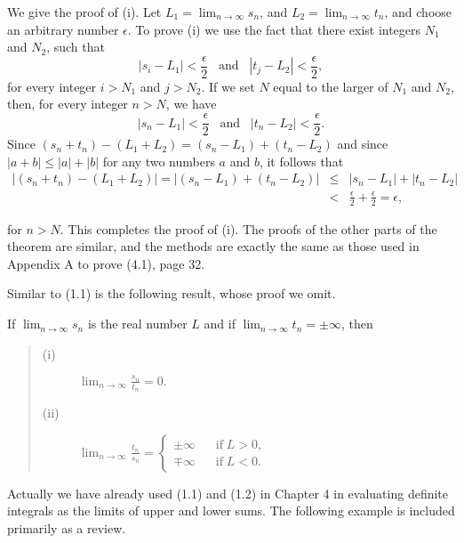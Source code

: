 We give the proof of (i). Let $L_1 = \lim_{n \rightarrow \infty} s_n$, and $L_2 = \lim_{n \rightarrow \infty} t_n$, and choose an arbitrary number $\epsilon$. To prove (i) we use the fact that there exist integers $N_1$ and $N_2$, such that
$$
|s_i - L_1 | < \frac{\epsilon}{2} \;\;\;  \mbox{and}\;\;\;  |t_j - L_2| < \frac{\epsilon}{2},
$$
for every integer $i > N_1$ and $j > N_2$. If we set $N$ equal to the larger of $N_1$ and $N_2$, then, for every integer $n > N$, we have
$$
|s_n - L_1| < \frac{\epsilon}{2}\;\;\; \mbox{and}\;\;\; | t_n - L_2 | < \frac{\epsilon}{2} .
$$
Since $(s_n + t_n) - (L_1 + L_2) = (s_n - L_1) + (t_n - L_2)$ and since $|a + b| \leq |a| + |b|$ for any two numbers $a$ and $b$, it follows that
\begin{eqnarray*}
|(s_n + t_n) - (L_1 + L_2)| = |(s_n - L_1) + (t_n - L_2)|
&\leq& |s_n - L_1| + |t_n - L_2 | \\
&<& \frac{\epsilon}{2} + \frac{\epsilon}{2} = \epsilon ,
\end{eqnarray*}

\noindent for $n > N$. This completes the proof of (i). The proofs of the other parts of the theorem are similar, and the methods are exactly the same as those used in Appendix A to prove (4.1), page 32.

Similar to (1.1) is the following result, whose proof we omit. 

\begin{theorem} %
If $\lim_{n \rightarrow \infty} s_n$ is the real number $L$ and if $\lim_{n \rightarrow \infty} t_n = \pm \infty$, then

\begin{quote}
\begin{description}

\item[(i)] $\lim_{n \rightarrow \infty} \frac{s_n}{t_n} = 0.$ 
\item[(ii)] $\lim_{n \rightarrow \infty} \frac{t_n}{s_n} 
= \left\{ \begin{array}{ll}
\pm \infty  &\;\;\;\mbox{if}\; L > 0, \\
\mp \infty  &\;\;\;\mbox{if}\; L < 0.
       \end{array}
       \right .
$
\end{description}
\end{quote} 
\end{theorem}

Actually we have already used (1.1) and (1.2) in Chapter 4 in evaluating definite integrals as the limits of upper and lower sums. The following example is included primarily as a review.

